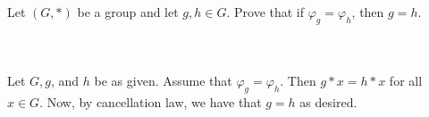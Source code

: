 Let $(G,*)$ be a group and let $g,h\in G$. Prove that if $\varphi_g=\varphi_h$, then $g=h$.\\\\

\begin{solution}\renewcommand{\qedsymbol}{}\ \\
    Let $G, g$, and $h$ be as given. Assume that $\varphi_g=\varphi_h$. Then $g*x=h*x$ for all
    $x\in G$. Now, by cancellation law, we have that $g=h$ as desired.

\end{solution}